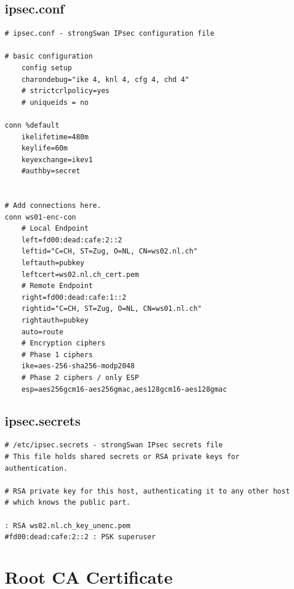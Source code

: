 \documentclass[a4paper]{report}
\begin{document}
\newpage

\section{ipsec.conf}
\label{app-sec:ipsec.conf-P2P}
\begin{lstlisting}
# ipsec.conf - strongSwan IPsec configuration file

# basic configuration
    config setup
    charondebug="ike 4, knl 4, cfg 4, chd 4"
    # strictcrlpolicy=yes
    # uniqueids = no

conn %default
    ikelifetime=480m
    keylife=60m
    keyexchange=ikev1
    #authby=secret


# Add connections here.
conn ws01-enc-con
    # Local Endpoint
    left=fd00:dead:cafe:2::2
    leftid="C=CH, ST=Zug, O=NL, CN=ws02.nl.ch"
    leftauth=pubkey
    leftcert=ws02.nl.ch_cert.pem
    # Remote Endpoint
    right=fd00:dead:cafe:1::2
    rightid="C=CH, ST=Zug, O=NL, CN=ws01.nl.ch"
    rightauth=pubkey
    auto=route
    # Encryption ciphers
    # Phase 1 ciphers
    ike=aes-256-sha256-modp2048
    # Phase 2 ciphers / only ESP
    esp=aes256gcm16-aes256gmac,aes128gcm16-aes128gmac
\end{lstlisting}


\section{ipsec.secrets}
\label{app-sec:ipsec.secrets-P2P}
\begin{lstlisting}
# /etc/ipsec.secrets - strongSwan IPsec secrets file
# This file holds shared secrets or RSA private keys for authentication.

# RSA private key for this host, authenticating it to any other host
# which knows the public part.

: RSA ws02.nl.ch_key_unenc.pem
#fd00:dead:cafe:2::2 : PSK superuser
\end{lstlisting}

\chapter{Root CA Certificate}
\end{document}
